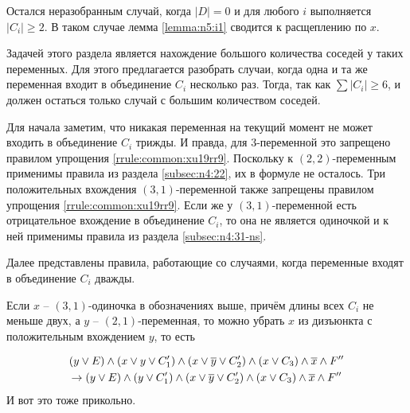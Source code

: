 Остался неразобранным случай, когда $|D| = 0$ и для любого $i$ выполняется $|C_i| \geq 2$.
В таком случае лемма \ref{lemma:n5:i1} сводится к расщеплению по $x$.

Задачей этого раздела является нахождение большого количества соседей у таких переменных.
Для этого предлагается разобрать случаи, когда одна и та же переменная входит в объединение $C_i$ несколько раз.
Тогда, так как $\sum |C_i| \geq 6$, и должен остаться только случай с большим количеством соседей.

Для начала заметим, что никакая переменная на текущий момент не может входить в объединение $C_i$ трижды. И правда, для 3-переменной это запрещено правилом упрощения \ref{rrule:common:xu19rr9}. Поскольку к $(2,2)$-переменным применимы правила из раздела \ref{subsec:n4:22}, их в формуле не осталось. Три положительных вхождения $(3,1)$-переменной также запрещены правилом упрощения \ref{rrule:common:xu19rr9}. Если же у $(3,1)$-переменной есть отрицательное вхождение в объединение $C_i$, то она не является одиночкой и к ней применимы правила из раздела \ref{subsec:n4:31-ns}.

Далее представлены правила, работающие со случаями, когда переменные входят в объединение $C_i$ дважды.

\begin{rrule}
 Если $x$ -- $(3,1)$-одиночка в обозначениях выше, причём длины всех $C_i$ не меньше двух, а $y$ -- $(2,1)$-переменная, то можно убрать $x$ из дизъюнкта с положительным вхождением $y$, то есть

 \begin{gather*}
  (y \vee E) \wedge (x \vee y \vee C_1') \wedge (x \vee \overline{y} \vee C_2') \wedge (x \vee C_3) \wedge \overline{x} \wedge F''\\
  \rightarrow
  (y \vee E) \wedge (y \vee C_1') \wedge (x \vee \overline{y} \vee C_2') \wedge (x \vee C_3) \wedge \overline{x} \wedge F''
 \end{gather*}
 {\color{white} И вот это тоже прикольно.}
 \label{rrule:n4:31:3v-2}
\end{rrule}


